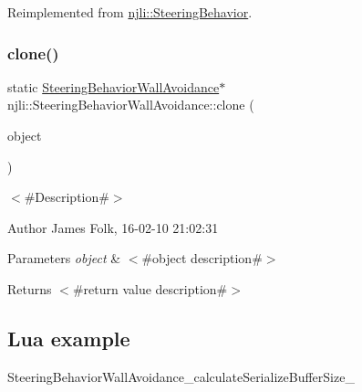 Reimplemented from \mbox{\hyperlink{classnjli_1_1_steering_behavior_abbc461d853c1b225cfde5b79d96d11bd}{njli\+::\+Steering\+Behavior}}.

\mbox{\label{classnjli_1_1_steering_behavior_wall_avoidance_accb95d70a5fba8e9146076074815253b}} 
\subsubsection{\texorpdfstring{clone()}{clone()}}
{\footnotesize\ttfamily static \mbox{\hyperlink{classnjli_1_1_steering_behavior_wall_avoidance}{Steering\+Behavior\+Wall\+Avoidance}}$\ast$ njli\+::\+Steering\+Behavior\+Wall\+Avoidance\+::clone (\begin{DoxyParamCaption}\item[{const \mbox{\hyperlink{classnjli_1_1_steering_behavior_wall_avoidance}{Steering\+Behavior\+Wall\+Avoidance}} \&}]{object }\end{DoxyParamCaption})\hspace{0.3cm}{\ttfamily [static]}}



$<$\#\+Description\#$>$ 

\begin{DoxyAuthor}{Author}
James Folk, 16-\/02-\/10 21\+:02\+:31
\end{DoxyAuthor}

\begin{DoxyParams}{Parameters}
{\em object} & $<$\#object description\#$>$\\
\hline
\end{DoxyParams}
\begin{DoxyReturn}{Returns}
$<$\#return value description\#$>$
\end{DoxyReturn}
\hypertarget{classnjli_1_1_steering_behavior_wander_ex1}{}\subsection{Lua example}\label{classnjli_1_1_steering_behavior_wander_ex1}

\begin{DoxyCodeInclude}
\end{DoxyCodeInclude}
Steering\+Behavior\+Wall\+Avoidance\+\_\+calculate\+Serialize\+Buffer\+Size\+\_\+ \mbox{\label{classnjli_1_1_steering_behavior_wall_avoidance_a2be7e595c37e5c401ea81e32e37cf81f}} 
